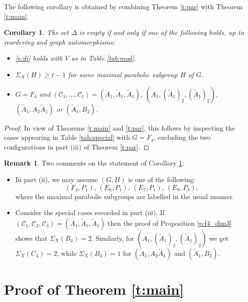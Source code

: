 \documentclass[twoside,a4paper,reqno,11pt]{amsart}
\newcommand{\<}{\langle}
\renewcommand{\>}{\rangle}
\newcommand{\geqs}{\geqslant}
\renewcommand{\:}{\colon}
\theoremstyle{plain}
\newtheorem{cor}[thm]{Corollary}
\theoremstyle{definition}
\newtheorem{rem}[thm]{Remark}
\begin{document}
The following corollary is obtained by combining Theorem \ref{t:par} with Theorem \ref{t:main}.

\begin{cor}\label{c:parab}
The set $\Delta$ is empty if and only if one of the following holds, up to reordering and graph automorphisms:
\begin{itemize}\addtolength{\itemsep}{0.2\baselineskip}
\item[{\rm (i)}] \eqref{e:di} holds with $V$ as in Table \ref{tab:mod}.
\item[{\rm (ii)}] $\Sigma_X(H) \geqs t-1$ for some maximal parabolic subgroup $H$ of $G$.
\item[{\rm (iii)}] $G=F_4$ and $(\mathcal{C}_1, \ldots, \mathcal{C}_t) = (A_1, \tilde{A}_1, \tilde{A}_1)$, $(A_1, (\tilde{A}_1)_2, (\tilde{A}_1)_2)$, $(\tilde{A}_1,A_2\tilde{A}_1)$ or $(\tilde{A}_1,B_2)$.
\end{itemize}
\end{cor}

\begin{proof}
In view of Theorems \ref{t:main} and \ref{t:par}, this follows by inspecting the cases appearing in Table \ref{tab:special} with $G=F_4$, excluding the two configurations in part (iii) of Theorem \ref{t:par}.
\end{proof}

\begin{rem}
Two comments on the statement of Corollary \ref{c:parab}:
\begin{itemize}\addtolength{\itemsep}{0.2\baselineskip}
\item[{\rm (a)}] In part (ii), we may assume $(G,H)$ is one of the following:
\[
(F_4,P_1), \, (E_6, P_1), \, (E_7, P_1), \, (E_8,P_8),
\]
where the maximal parabolic subgroups are labelled in the usual manner.
\item[{\rm (b)}] Consider the special cases recorded in part (iii). If $(\mathcal{C}_1, \mathcal{C}_2,\mathcal{C}_3) = (A_1, \tilde{A}_1, \tilde{A}_1)$ then the proof of Proposition \ref{p:f4_dim3} shows that $\Sigma_X(B_4) = 2$. Similarly, for $(A_1, (\tilde{A}_1)_2, (\tilde{A}_1)_2)$ we get $\Sigma_X(C_4) = 2$, while $\Sigma_X(B_4) = 1$ for $(\tilde{A}_1,A_2\tilde{A}_1)$ and $(\tilde{A}_1,B_2)$.
\end{itemize}
\end{rem}

\section{Proof of Theorem \ref{t:main}}\label{s:main}
\end{document}
